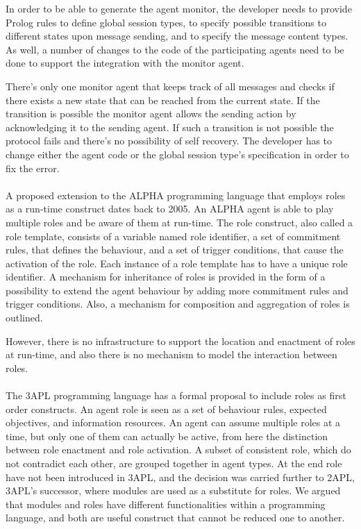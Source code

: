 \documentclass[a4paper,12pt,oneside,fleqn]{book} %
\begin{document}
In order to be able to generate the agent monitor, the developer needs to
provide Prolog rules to define global session types, to specify possible
transitions to different states upon message sending, and to specify the
message content types. As well, a number of changes to the code of the
participating agents need to be done to support the integration with the
monitor agent.

There's only one monitor agent that keeps track of all messages and checks
if there exists a new state that can be reached from the current state. If
the transition is possible the monitor agent allows the sending action by
acknowledging it to the sending agent. If such a transition is not
possible the protocol fails and there's no possibility of self recovery.
The developer has to change either the agent code or the global session
type's specification in order to fix the error.
\\~\\

A proposed extension to the ALPHA programming language that employs roles
as a run-time construct dates back to 2005\cite{Collier_arole-based}. An
ALPHA agent is able to play multiple roles and be aware of them at
run-time. The role construct, also called a role template, consists of a
variable named role identifier, a set of commitment rules, that defines the
behaviour, and a set of trigger conditions, that cause the activation of
the role. Each instance of a role template has to have a unique role
identifier. A mechanism for inheritance of roles is provided in the form of
a possibility to  extend the agent behaviour by adding more commitment
rules and trigger conditions.  Also, a mechanism for composition and
aggregation of roles is outlined.

However, there is no infrastructure to support the location and enactment
of roles at run-time, and also there is no mechanism to model the
interaction between roles. \\~\\

The 3APL programming language\cite{DBLP:conf/aose/DastaniRHDM04} has a
formal proposal to include roles as first order constructs. An agent role
is seen as a set of behaviour rules, expected objectives, and information
resources. An agent can assume multiple roles at a time, but only one of
them can actually be active, from here the distinction between role
enactment and role activation. A subset of consistent role, which do not
contradict each other, are grouped together in agent types. At the end role
have not been introduced in 3APL, and the decision was carried further to
2APL\cite{DBLP:journals/aamas/Dastani08}, 3APL's successor, where modules
are used as a substitute for roles. We argued that modules and roles have
different functionalities within a programming language, and both are
useful construct that cannot be reduced one to another.\\~\\
\end{document}
